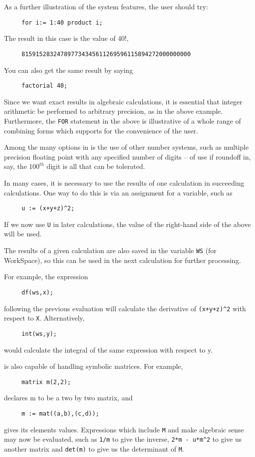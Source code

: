 As a further illustration of the system features, the user should try:
\begin{verbatim}
     for i:= 1:40 product i;
\end{verbatim}
The result in this case is the value of 40!,
\begin{verbatim}
     815915283247897734345611269596115894272000000000
\end{verbatim}
You can also get the same result by saying
\begin{verbatim}
     factorial 40;
\end{verbatim}
Since we want exact results in algebraic calculations, it is essential that
integer arithmetic be performed to arbitrary precision, as in the above
example. Furthermore, the {\tt FOR} statement in the above is illustrative of a
whole range of combining forms which {\REDUCE} supports for the convenience of
the user.

Among the many options in {\REDUCE} is the use of other number systems, such
as multiple precision floating point with any specified number of digits --
of use if roundoff in, say, the $100^{th}$ digit is all that can be tolerated.

In many cases, it is necessary to use the results of one calculation in
succeeding calculations. One way to do this is via an assignment for a
variable, such as
\begin{verbatim}
     u := (x+y+z)^2;
\end{verbatim}
If we now use {\tt U} in later calculations, the value of the right-hand
side of the above will be used.

The results of a given calculation are also saved in the variable
{\tt WS}  (for WorkSpace), so this can be used in the next
calculation for further processing.

For example, the expression
\begin{verbatim}
     df(ws,x);
\end{verbatim}
following the previous evaluation will calculate the derivative of
{\tt (x+y+z)\^{ }2} with respect to {\tt X}. Alternatively,
\begin{verbatim}
     int(ws,y);
\end{verbatim}
would calculate the integral of the same expression with respect to y.

{\REDUCE} is also capable of handling symbolic matrices. For example,
\begin{verbatim}
     matrix m(2,2);
\end{verbatim}
declares m to be a two by two matrix, and
\begin{verbatim}
     m := mat((a,b),(c,d));
\end{verbatim}
gives its elements values.  Expressions which include {\tt M} and make
algebraic sense may now be evaluated, such as {\tt 1/m} to give the
inverse, {\tt 2*m - u*m\^{ }2} to give us another matrix and {\tt det(m)} to
give us the determinant of {\tt M}.


